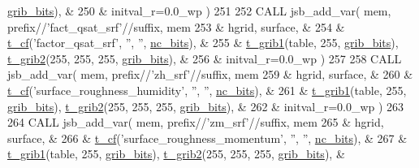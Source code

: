 \begin{DoxyCode}
      \hyperlink{namespacemo__jsb__io_aade09fd070010f905e77497f041ce6c3}{grib\_bits}),   &
250       & initval\_r=0.0\_wp )
251 
252     \textcolor{keyword}{CALL }jsb\_add\_var( mem, prefix//\textcolor{stringliteral}{'fact\_qsat\_srf'}//suffix, mem%
253       & hgrid, surface,                                                      &
254       & \hyperlink{structmo__jsb__io_1_1t__cf}{t\_cf}(\textcolor{stringliteral}{'factor\_qsat\_srf'}, \textcolor{stringliteral}{''}, \textcolor{stringliteral}{''}, \hyperlink{namespacemo__jsb__io_a4bf2b656fa0a7acf938f0bfcad5870e3}{nc\_bits}),                               &
255       & \hyperlink{structmo__jsb__io_1_1t__grib1}{t\_grib1}(table, 255, \hyperlink{namespacemo__jsb__io_aade09fd070010f905e77497f041ce6c3}{grib\_bits}), \hyperlink{structmo__jsb__io_1_1t__grib2}{t\_grib2}(255, 255, 255, 
      \hyperlink{namespacemo__jsb__io_aade09fd070010f905e77497f041ce6c3}{grib\_bits}),   &
256       & initval\_r=0.0\_wp )
257 
258     \textcolor{keyword}{CALL }jsb\_add\_var( mem, prefix//\textcolor{stringliteral}{'zh\_srf'}//suffix, mem%
259       & hgrid, surface,                                                      &
260       & \hyperlink{structmo__jsb__io_1_1t__cf}{t\_cf}(\textcolor{stringliteral}{'surface\_roughness\_humidity'}, \textcolor{stringliteral}{''}, \textcolor{stringliteral}{''}, \hyperlink{namespacemo__jsb__io_a4bf2b656fa0a7acf938f0bfcad5870e3}{nc\_bits}),                    &
261       & \hyperlink{structmo__jsb__io_1_1t__grib1}{t\_grib1}(table, 255, \hyperlink{namespacemo__jsb__io_aade09fd070010f905e77497f041ce6c3}{grib\_bits}), \hyperlink{structmo__jsb__io_1_1t__grib2}{t\_grib2}(255, 255, 255, 
      \hyperlink{namespacemo__jsb__io_aade09fd070010f905e77497f041ce6c3}{grib\_bits}),   &
262       & initval\_r=0.0\_wp )
263 
264     \textcolor{keyword}{CALL }jsb\_add\_var( mem, prefix//\textcolor{stringliteral}{'zm\_srf'}//suffix, mem%
265       & hgrid, surface,                                                      &
266       & \hyperlink{structmo__jsb__io_1_1t__cf}{t\_cf}(\textcolor{stringliteral}{'surface\_roughness\_momentum'}, \textcolor{stringliteral}{''}, \textcolor{stringliteral}{''}, \hyperlink{namespacemo__jsb__io_a4bf2b656fa0a7acf938f0bfcad5870e3}{nc\_bits}),                    &
267       & \hyperlink{structmo__jsb__io_1_1t__grib1}{t\_grib1}(table, 255, \hyperlink{namespacemo__jsb__io_aade09fd070010f905e77497f041ce6c3}{grib\_bits}), \hyperlink{structmo__jsb__io_1_1t__grib2}{t\_grib2}(255, 255, 255, 
      \hyperlink{namespacemo__jsb__io_aade09fd070010f905e77497f041ce6c3}{grib\_bits}),   &

\end{DoxyCode}
